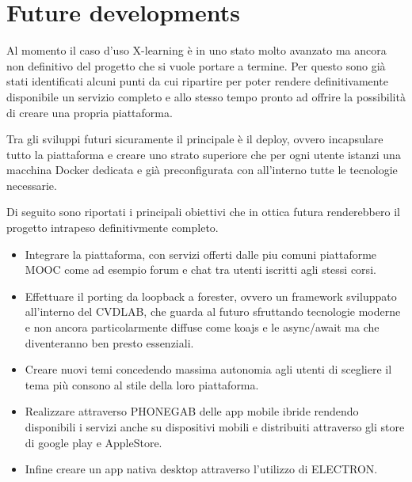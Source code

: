 \section{Future developments}
\label{sec:future_developments}

Al momento il caso d'uso X-learning è in uno stato molto avanzato ma ancora non definitivo del progetto che si vuole portare a termine.
Per questo sono già stati identificati alcuni punti da cui ripartire per poter rendere definitivamente disponibile un servizio completo e allo stesso tempo pronto ad offrire la possibilità di creare una propria piattaforma.

Tra gli sviluppi futuri sicuramente il principale è il deploy, ovvero incapsulare tutto la piattaforma e creare uno strato superiore che per ogni utente istanzi una macchina Docker dedicata e già preconfigurata con all'interno tutte le tecnologie necessarie.

Di seguito sono riportati i principali obiettivi che in ottica futura renderebbero il progetto intrapeso definitivmente completo.

\begin{itemize}
  \item Integrare la piattaforma, con servizi offerti dalle piu comuni piattaforme MOOC come ad esempio forum e chat tra utenti iscritti agli stessi corsi.

  \item Effettuare il porting da loopback a forester, ovvero un framework sviluppato all'interno del CVDLAB, che guarda al futuro sfruttando tecnologie moderne e non ancora particolarmente diffuse come koajs e le async/await ma che diventeranno ben presto essenziali. 

  \item Creare nuovi temi concedendo massima autonomia agli utenti di scegliere il tema più consono al stile della loro piattaforma.

  \item Realizzare attraverso PHONEGAB delle app mobile ibride rendendo disponibili i servizi anche su dispositivi mobili e distribuiti attraverso gli store di google play e AppleStore.

  \item Infine creare un app nativa desktop attraverso l'utilizzo di ELECTRON.

\end{itemize}